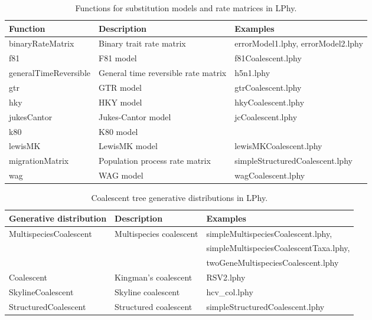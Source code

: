 \documentclass[12pt]{article} %
\begin{document}
\begin{table}
\small
\centering
\begin{tabular}{ l | l | l }
    \hline\hline
    Function & Description & Examples \\ 
    \hline\hline
    binaryRateMatrix & Binary trait rate matrix & errorModel1.lphy, errorModel2.lphy\\  
    f81 & F81 model\cite{felsenstein1981} & f81Coalescent.lphy\\  
    generalTimeReversible & General time reversible rate matrix & h5n1.lphy \\  
    gtr & GTR model\cite{tarvare1986some} & gtrCoalescent.lphy\\  
    hky & HKY model\cite{hasegawa1985dating} & hkyCoalescent.lphy\\  
    jukesCantor & Jukes-Cantor model\cite{jc69} & jcCoalescent.lphy\\  
    k80 & K80 model\cite{kimura1980simple} & \\  
    lewisMK & LewisMK model\cite{lewis2001likelihood} & lewisMKCoalescent.lphy\\  
    migrationMatrix & Population process rate matrix & simpleStructuredCoalescent.lphy\\  
    wag & WAG model\cite{whelan2001general} & wagCoalescent.lphy\\  
    \hline
\end{tabular}

\label{tab:ratematrix}
\caption{Functions for substitution models and rate matrices in LPhy.}
\end{table}

\begin{table}
\small
\begin{tabular}{ l | l | l }
    \hline\hline
    Generative distribution & Description & Examples \\ 
    \hline\hline
    MultispeciesCoalescent & Multispecies coalescent & simpleMultispeciesCoalescent.lphy, \\ & & simpleMultispeciesCoalescentTaxa.lphy, \\ & & twoGeneMultispeciesCoalescent.lphy\\  
    Coalescent & Kingman's coalescent \cite{Rodrigo1999SerialCoalescent} & RSV2.lphy \\  
    SkylineCoalescent & Skyline coalescent \cite{drummond2005bayesiansequences} & hcv\_col.lphy\\  
    StructuredCoalescent & Structured coalescent\cite{muller2017structured} & simpleStructuredCoalescent.lphy\\  
    \hline
\end{tabular}

\label{tab:coalescent}
\caption{Coalescent tree generative distributions in LPhy.}
\end{table}
\end{document}
